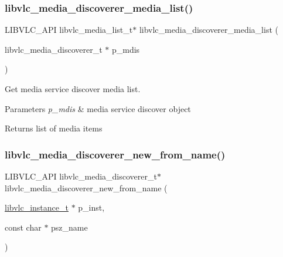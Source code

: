 \subsubsection{\texorpdfstring{libvlc\+\_\+media\+\_\+discoverer\+\_\+media\+\_\+list()}{libvlc\_media\_discoverer\_media\_list()}}
{\footnotesize\ttfamily L\+I\+B\+V\+L\+C\+\_\+\+A\+PI libvlc\+\_\+media\+\_\+list\+\_\+t$\ast$ libvlc\+\_\+media\+\_\+discoverer\+\_\+media\+\_\+list (\begin{DoxyParamCaption}\item[{libvlc\+\_\+media\+\_\+discoverer\+\_\+t $\ast$}]{p\+\_\+mdis }\end{DoxyParamCaption})}

Get media service discover media list.


\begin{DoxyParams}{Parameters}
{\em p\+\_\+mdis} & media service discover object \\
\hline
\end{DoxyParams}
\begin{DoxyReturn}{Returns}
list of media items 
\end{DoxyReturn}
\mbox{\label{group__libvlc__media__discoverer_gacf768ef894b3d9eb3f655bdc31a31f66}} 
\subsubsection{\texorpdfstring{libvlc\+\_\+media\+\_\+discoverer\+\_\+new\+\_\+from\+\_\+name()}{libvlc\_media\_discoverer\_new\_from\_name()}}
{\footnotesize\ttfamily L\+I\+B\+V\+L\+C\+\_\+\+A\+PI libvlc\+\_\+media\+\_\+discoverer\+\_\+t$\ast$ libvlc\+\_\+media\+\_\+discoverer\+\_\+new\+\_\+from\+\_\+name (\begin{DoxyParamCaption}\item[{\hyperlink{group__libvlc__core_ga316d739a80da4678206c79f4d6c2e284}{libvlc\+\_\+instance\+\_\+t} $\ast$}]{p\+\_\+inst,  }\item[{const char $\ast$}]{psz\+\_\+name }\end{DoxyParamCaption})}

